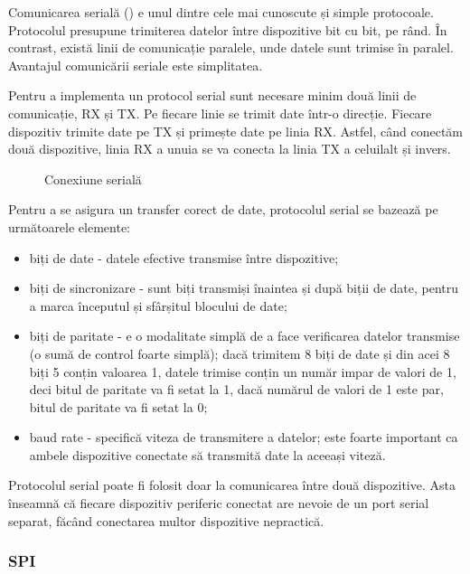 Comunicarea serială () e unul dintre cele mai cunoscute și simple protocoale.
 Protocolul presupune trimiterea datelor între dispozitive bit cu bit, pe rând.
 În contrast, există linii de comunicație paralele, unde datele sunt trimise în paralel.
Avantajul comunicării seriale este simplitatea.

Pentru a implementa un protocol serial sunt necesare minim două linii de comunicație, RX și TX.
Pe fiecare linie se trimit date într-o direcție.
Fiecare dispozitiv trimite date pe TX și primește date pe linia RX.
Astfel, când conectăm două dispozitive, linia RX a unuia se va conecta la linia TX a celuilalt și invers.

\begin{figure}[htbp]
  \centering
  \def\svgwidth{\columnwidth}
  
  \caption{Conexiune serială}
  \label{fig:embed:serial}
\end{figure}

Pentru a se asigura un transfer corect de date, protocolul serial se bazează pe următoarele elemente:

\begin{itemize}
  \item biți de date - datele efective transmise între dispozitive;
  \item biți de sincronizare - sunt biți transmiși înaintea și după biții de date, pentru a marca începutul și sfârșitul blocului de date;
  \item biți de paritate - e o modalitate simplă de a face verificarea datelor transmise (o sumă de control foarte simplă);
    dacă trimitem 8 biți de date și din acei 8 biți 5 conțin valoarea 1, datele trimise conțin un număr impar de valori de 1, deci bitul de paritate va fi setat la 1, dacă numărul de valori de 1 este par, bitul de paritate va fi setat la 0;
  \item baud rate - specifică viteza de transmitere a datelor;
    este foarte important ca ambele dispozitive conectate să transmită date la aceeași viteză.
\end{itemize}

Protocolul serial poate fi folosit doar la comunicarea între două dispozitive.
 Asta înseamnă că fiecare dispozitiv periferic conectat are nevoie de un port serial separat, făcând conectarea multor dispozitive nepractică.

\subsubsection{SPI}
\label{sec:embed:bus:wired:spi}

